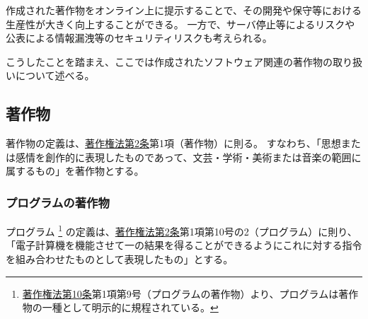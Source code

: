 

作成された著作物をオンライン上に提示することで、その開発や保守等における生産性が大きく向上することができる。
一方で、サーバ停止等によるリスクや公表による情報漏洩等のセキュリティリスクも考えられる。

こうしたことを踏まえ、ここでは作成されたソフトウェア関連の著作物の取り扱いについて述べる。





\subsection{著作物}
著作物の定義は、\href{https://elaws.e-gov.go.jp/document?lawid=345AC0000000048#Mp-At_2}{著作権法第2条}第1項（著作物）\cite{online:eGovCopyrightLaw}に則る。
すなわち、「思想または感情を創作的に表現したものであって、文芸・学術・美術または音楽の範囲に属するもの」を著作物とする。

\subsubsection{プログラムの著作物}
プログラム
\footnote{\href{https://elaws.e-gov.go.jp/document?lawid=345AC0000000048\#Mp-At_10}{著作権法第10条}第1項第9号（プログラムの著作物）\cite{online:eGovCopyrightLaw}より、プログラムは著作物の一種として明示的に規程されている。}
の定義は、\href{https://elaws.e-gov.go.jp/document?lawid=345AC0000000048\#Mp-At_2}{著作権法第2条}第1項第10号の2（プログラム）\cite{online:eGovCopyrightLaw}に則り、「電子計算機を機能させて一の結果を得ることができるようにこれに対する指令を組み合わせたものとして表現したもの」とする。

